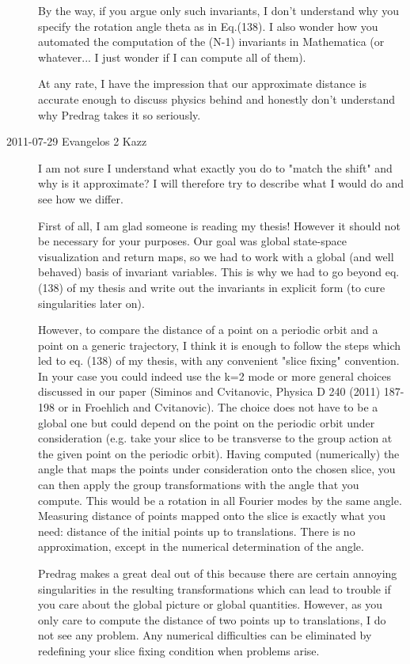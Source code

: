 \begin{description}
By the way, if you argue only such invariants, I don't understand why you
specify the rotation angle theta as in Eq.(138). I also wonder how you
automated the computation of the (N-1) invariants in Mathematica (or
whatever... I just wonder if I can compute all of them).

At any rate, I have the impression that our approximate distance is
accurate enough to discuss physics behind and honestly don't understand
why Predrag takes it so seriously.

\item[2011-07-29 Evangelos 2 Kazz]
I am not sure I understand what exactly you do to "match the shift"
and why is it approximate? I will therefore try to describe what I
would do and see how we differ.

First of all, I am glad someone is reading my thesis! However it
should not be necessary for your purposes. Our goal was global
state-space visualization and return maps, so we had to work with a
global (and well behaved) basis of invariant variables. This is why we
had to go beyond eq. (138) of my thesis and write out the invariants
in explicit form (to cure singularities later on).

However, to compare the distance of a point on a periodic orbit and a
point on a generic trajectory, I think it is enough to follow the
steps which led to eq. (138) of my thesis, with any convenient "slice
fixing" convention. In your case you could indeed use the k=2 mode or
more general choices discussed in our paper (Siminos and Cvitanovic,
Physica D 240 (2011) 187-198 or in Froehlich and Cvitanovic). The
choice does not have to be a global one but could depend on the point
on the periodic orbit under consideration (e.g. take your slice to be
transverse to the group action at the given point on the periodic
orbit). Having computed (numerically) the angle that maps the points
under consideration onto the chosen slice, you can then apply the
group transformations with the angle that you compute. This would be a
rotation in all Fourier modes by the same angle. Measuring distance of
points mapped onto the slice is exactly what you need: distance of the
initial points up to translations. There is no approximation, except
in the numerical determination of the angle.

Predrag makes a great deal out of this because there are certain
annoying singularities in the resulting transformations which can lead
to trouble if you care about the global picture or global quantities.
However, as you only care to compute the distance of two points up to
translations, I do not see any problem. Any numerical difficulties can
be eliminated by redefining your slice fixing condition when problems
arise.


\end{description}
